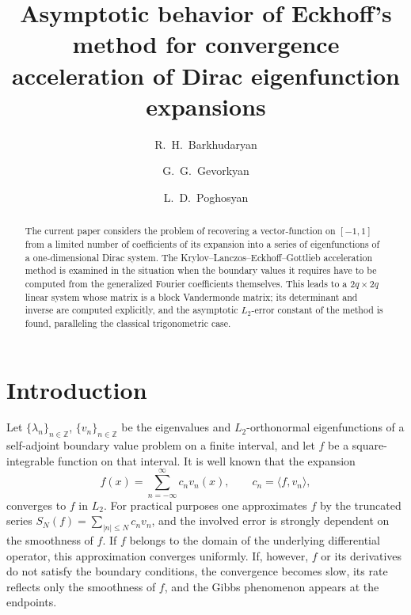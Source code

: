 \documentclass[11pt,a4paper]{article}
\theoremstyle{definition}
\begin{document}
\title{Asymptotic behavior of Eckhoff's method for convergence acceleration
 of Dirac eigenfunction expansions}

\author[1,2]{R.~H.~Barkhudaryan}
\author[1]{G.~G.~Gevorkyan}
\author[1,2,3]{L.~D.~Poghosyan}



\maketitle


\begin{abstract}
    The current paper considers the problem of recovering a vector-function on $[-1,1]$ from a limited number of coefficients of its expansion into a series of eigenfunctions of a one-dimensional Dirac system. The Krylov--Lanczos--Eckhoff--Gottlieb acceleration method is examined in the situation when the boundary values it requires have to be computed from the generalized Fourier coefficients themselves. This leads to a $2q\times 2q$ linear system whose matrix is a block Vandermonde matrix; its determinant and inverse are computed explicitly, and the asymptotic $L_2$-error constant of the method is found, paralleling the classical trigonometric case.
\end{abstract}


\section*{Introduction}

Let $\{\lambda_n\}_{n\in\mathbb{Z}}$, $\{v_n\}_{n\in\mathbb{Z}}$ be the
eigenvalues and $L_2$-orthonormal eigenfunctions of a self-adjoint
boundary value problem on a finite interval, and let $f$ be a
square-integrable function on that interval. It is well known that the
expansion
\[
f(x)=\sum_{n=-\infty}^{\infty}c_n v_n(x),\qquad
c_n=\langle f,v_n\rangle,
\]
converges to $f$ in $L_2$. For practical purposes one approximates
$f$ by the truncated series $S_N(f)=\sum_{|n|\le N}c_n v_n$, and the
involved error is strongly dependent on the smoothness of $f$. If $f$
belongs to the domain of the underlying differential operator, this
approximation converges uniformly. If, however, $f$ or its derivatives
do not satisfy the boundary conditions, the convergence becomes slow,
its rate reflects only the smoothness of $f$, and the Gibbs phenomenon
appears at the endpoints.
\end{document}
